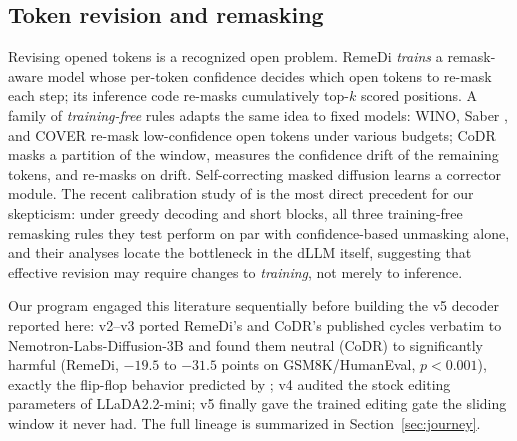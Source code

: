 \subsection{Token revision and remasking}
Revising opened tokens is a recognized open problem. RemeDi \citep{remedi}
\emph{trains} a remask-aware model whose per-token confidence decides which open
tokens to re-mask each step; its inference code re-masks cumulatively top-$k$
scored positions. A family of \emph{training-free} rules adapts the same idea to
fixed models: WINO, Saber \citep{saber}, and COVER re-mask low-confidence open
tokens under various budgets; CoDR \citep{codr} masks a partition of the window,
measures the confidence drift of the remaining tokens, and re-masks on drift.
Self-correcting masked diffusion \citep{proseco} learns a corrector module.
The recent calibration study of \citet{remeval} is the most direct precedent for
our skepticism: under greedy decoding and short blocks, all three training-free
remasking rules they test perform on par with confidence-based unmasking alone,
and their analyses locate the bottleneck in the dLLM itself, suggesting that
effective revision may require changes to \emph{training}, not merely to inference.

Our program engaged this literature sequentially before building the v5 decoder
reported here: v2--v3 ported RemeDi's and CoDR's published cycles verbatim to
Nemotron-Labs-Diffusion-3B and found them neutral (CoDR) to significantly harmful
(RemeDi, $-19.5$ to $-31.5$ points on GSM8K/HumanEval, $p<0.001$), exactly the
flip-flop behavior predicted by \citet{remeval}; v4 audited the stock editing
parameters of LLaDA2.2-mini; v5 finally gave the trained editing gate the sliding
window it never had. The full lineage is summarized in Section~\ref{sec:journey}.
